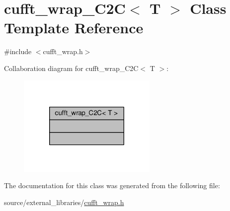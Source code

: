 \hypertarget{classcufft__wrap__C2C}{\section{cufft\-\_\-wrap\-\_\-\-C2\-C$<$ T $>$ Class Template Reference}
\label{classcufft__wrap__C2C}
}


{\ttfamily \#include $<$cufft\-\_\-wrap.\-h$>$}



Collaboration diagram for cufft\-\_\-wrap\-\_\-\-C2\-C$<$ T $>$\-:
\nopagebreak
\begin{figure}[H]
\begin{center}
\leavevmode
\includegraphics[width=190pt]{classcufft__wrap__C2C__coll__graph}
\end{center}
\end{figure}


The documentation for this class was generated from the following file\-:\begin{DoxyCompactItemize}
\item 
source/external\-\_\-libraries/\hyperlink{cufft__wrap_8h}{cufft\-\_\-wrap.\-h}\end{DoxyCompactItemize}
